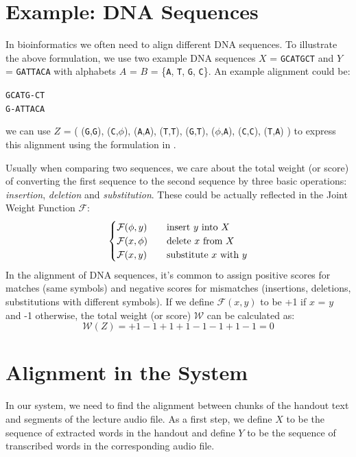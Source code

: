 \section{Example: DNA Sequences}

In bioinformatics we often need to align different DNA sequences. To illustrate the above formulation, we use two example DNA sequences $X$ = \texttt{GCATGCT} and $Y$ = \texttt{GATTACA} with alphabets $A$ = $B$ = \{\texttt{A}, \texttt{T}, \texttt{G}, \texttt{C}\}. An example alignment could be:
\begin{center}
  \texttt{GCATG-CT}\\
  \texttt{G-ATTACA}
\end{center}
we can use $Z$ = (
  (\texttt{G},\texttt{G}),
  (\texttt{C},$\phi$),
  (\texttt{A},\texttt{A}),
  (\texttt{T},\texttt{T}),
  (\texttt{G},\texttt{T}),
  ($\phi$,\texttt{A}),
  (\texttt{C},\texttt{C}),
  (\texttt{T},\texttt{A})
) to express this alignment using the formulation in .

Usually when comparing two sequences, we care about the total weight (or score) of converting the first sequence to the second sequence by three basic operations: \textit{insertion}, \textit{deletion} and \textit{substitution}. These could be actually reflected in the Joint Weight Function $\mathcal{F}$:
\[
  \begin{cases}
    \mathcal{F}(\phi,y) & \text{\quad insert } y \text{ into } X \\
    \mathcal{F}(x,\phi) & \text{\quad delete } x \text{ from } X \\
    \mathcal{F}(x,y) & \text{\quad substitute } x \text{ with } y
  \end{cases}
\]
In the alignment of DNA sequences, it's common to assign positive scores for matches (same symbols) and negative scores for mismatches (insertions, deletions, substitutions with different symbols). If we define $\mathcal{F}(x,y)$ to be +1 if $x$ = $y$ and -1 otherwise, the total weight (or score) $\mathcal{W}$ can be calculated as:
\[ \mathcal{W}(Z) = + 1 - 1 + 1 + 1 - 1 - 1 + 1 - 1 = 0 \]

\section{Alignment in the System}

In our system, we need to find the alignment between chunks of the handout text and segments of the lecture audio file. As a first step, we define $X$ to be the sequence of extracted words in the handout and define $Y$ to be the sequence of transcribed words in the corresponding audio file.

